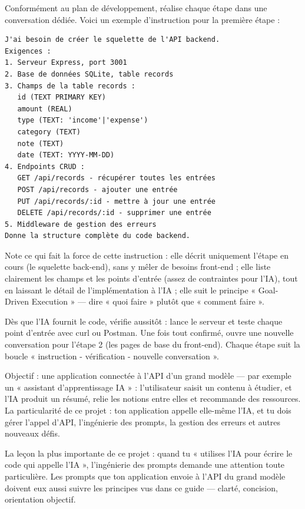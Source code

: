 
Conformément au plan de développement, réalise chaque étape dans une conversation dédiée. Voici un exemple d'instruction pour la première étape :

\begin{lstlisting}
J'ai besoin de créer le squelette de l'API backend.
Exigences :
1. Serveur Express, port 3001
2. Base de données SQLite, table records
3. Champs de la table records :
   id (TEXT PRIMARY KEY)
   amount (REAL)
   type (TEXT: 'income'|'expense')
   category (TEXT)
   note (TEXT)
   date (TEXT: YYYY-MM-DD)
4. Endpoints CRUD :
   GET /api/records - récupérer toutes les entrées
   POST /api/records - ajouter une entrée
   PUT /api/records/:id - mettre à jour une entrée
   DELETE /api/records/:id - supprimer une entrée
5. Middleware de gestion des erreurs
Donne la structure complète du code backend.
\end{lstlisting}

Note ce qui fait la force de cette instruction : elle décrit uniquement l'étape en cours (le squelette back-end), sans y mêler de besoins front-end ; elle liste clairement les champs et les points d'entrée (assez de contraintes pour l'IA), tout en laissant le détail de l'implémentation à l'IA ; elle suit le principe « Goal-Driven Execution » — dire « quoi faire » plutôt que « comment faire ».

Dès que l'IA fournit le code, vérifie aussitôt : lance le serveur et teste chaque point d'entrée avec curl ou Postman. Une fois tout confirmé, ouvre une nouvelle conversation pour l'étape 2 (les pages de base du front-end). Chaque étape suit la boucle « instruction - vérification - nouvelle conversation ».



Objectif : une application connectée à l'API d'un grand modèle — par exemple un « assistant d'apprentissage IA » : l'utilisateur saisit un contenu à étudier, et l'IA produit un résumé, relie les notions entre elles et recommande des ressources. La particularité de ce projet : ton application appelle elle-même l'IA, et tu dois gérer l'appel d'API, l'ingénierie des prompts, la gestion des erreurs et autres nouveaux défis.

La leçon la plus importante de ce projet : quand tu « utilises l'IA pour écrire le code qui appelle l'IA », l'ingénierie des prompts demande une attention toute particulière. Les prompts que ton application envoie à l'API du grand modèle doivent eux aussi suivre les principes vus dans ce guide — clarté, concision, orientation objectif.

